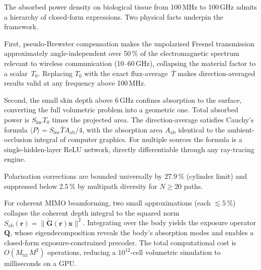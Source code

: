 \documentclass[11pt,a4paper]{article}
\theoremstyle{definition}
\newcommand{\Sinc}{S_{\mathrm{inc}}}
\newcommand{\Sab}{S_{\mathrm{ab}}}
\newcommand{\Aab}{A_{\mathrm{ab}}}
\newcommand{\Tbar}{\bar{T}}
\begin{document}
The absorbed power density on biological tissue from 100\,MHz to
100\,GHz admits a hierarchy of closed-form expressions.  Two physical
facts underpin the framework.

First, pseudo-Brewster compensation makes the unpolarised Fresnel
transmission approximately angle-independent over 50\,\% of the
electromagnetic spectrum relevant to wireless communication
(10--60\,GHz), collapsing the material factor to a scalar~$T_0$.
Replacing $T_0$ with the exact flux-average~$\Tbar$ makes
direction-averaged results valid at any frequency above 100\,MHz.

Second, the small skin depth above 6\,GHz confines absorption to the
surface, converting the full volumetric problem into a geometric one.
Total absorbed power is $\Sinc T_0$ times the projected area.  The
direction-average satisfies Cauchy's formula $\langle P\rangle =
\Sinc\Tbar\Aab/4$, with the absorption area $\Aab$ identical to
the ambient-occlusion integral of computer graphics.  For multiple
sources the formula is a single-hidden-layer ReLU network, directly
differentiable through any ray-tracing engine.

Polarisation corrections are bounded universally by 27.9\,\% (cylinder
limit) and suppressed below 2.5\,\% by multipath diversity for
$N\ge 20$ paths.

For coherent MIMO beamforming, two small approximations (each
$\lesssim 5\,\%$) collapse the coherent depth integral to the squared
norm $\Sab(\mathbf{r})=\|\tilde{\mathbf{G}}(\mathbf{r})\mathbf{x}\|^2$.
Integrating over the body yields the exposure operator $\mathbf{Q}$,
whose eigendecomposition reveals the body's absorption modes and enables
a closed-form exposure-constrained precoder.  The total computational
cost is $O(M_{\mathrm{tri}}\,M^2)$ operations, reducing a
$10^{12}$-cell volumetric simulation to milliseconds on a GPU.
\end{document}
